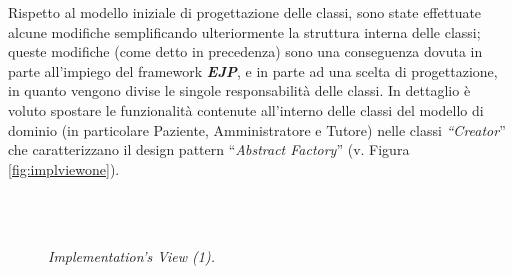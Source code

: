 Rispetto al modello iniziale di progettazione delle classi, sono state
effettuate alcune modifiche semplificando ulteriormente la struttura
interna delle classi; queste modifiche (come detto in precedenza)
sono una conseguenza dovuta in parte all'impiego del framework \textbf{\emph{EJP}},
e in parte ad una scelta di progettazione, in quanto vengono divise
le singole responsabilità delle classi. In dettaglio è voluto spostare
le funzionalità contenute all'interno delle classi del modello di
dominio (in particolare Paziente, Amministratore e Tutore) nelle classi
\emph{``Creator}'' che caratterizzano il design pattern ``\emph{Abstract
Factory}'' (v. Figura \vref{fig:implviewone}).

\begin{figure}[!thp]
	\centering
	\\
	\\
	\caption{\it{Implementation's View (1)}.}
	\label{fig:implviewtwo}
\end{figure}
